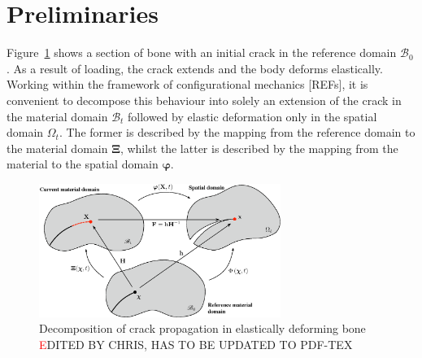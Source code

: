 \documentclass[review]{elsarticle}
\numberwithin{equation}{section}
\begin{document}
 
 \section{Preliminaries}
 
Figure~\ref{F1} shows a section of bone with an initial crack in the reference domain $\mathscr{B}_{0}$. As a result of loading, the crack extends and the body deforms elastically. Working within the framework of configurational mechanics [REFs], it is convenient to decompose this behaviour into solely an extension of the crack in the material domain  $\mathscr{B}_t$ followed by elastic deformation only in the spatial domain $\Omega_t$. The former is described by the mapping from the reference  domain to the material domain ${\boldsymbol\Xi}$, whilst the latter is described by the mapping from the material to the spatial domain ${\boldsymbol\varphi}$. 
\begin{figure}[th]
\setlength{\fboxsep}{0pt}%
\setlength{\fboxrule}{0pt}%
\begin{center}
\includegraphics[width=0.7\textwidth]{Figures/domains4.eps}
\end{center}
\caption{Decomposition of crack propagation in elastically deforming bone \label{F1} \textcolor{red} EDITED BY CHRIS, HAS TO BE UPDATED TO PDF-TEX}
\end{figure}
\end{document}

